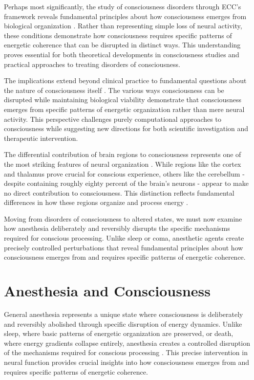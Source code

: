 \begin{refsection}
Perhaps most significantly, the study of consciousness disorders through ECC's framework reveals fundamental principles about how consciousness emerges from biological organization \cite{Tononi2015}. Rather than representing simple loss of neural activity, these conditions demonstrate how consciousness requires specific patterns of energetic coherence that can be disrupted in distinct ways. This understanding proves essential for both theoretical developments in consciousness studies and practical approaches to treating disorders of consciousness.

The implications extend beyond clinical practice to fundamental questions about the nature of consciousness itself \cite{Laureys2004}. The various ways consciousness can be disrupted while maintaining biological viability demonstrate that consciousness emerges from specific patterns of energetic organization rather than mere neural activity. This perspective challenges purely computational approaches to consciousness while suggesting new directions for both scientific investigation and therapeutic intervention.

The differential contribution of brain regions to consciousness represents one of the most striking features of neural organization \cite{Baars2005}. While regions like the cortex and thalamus prove crucial for conscious experience, others like the cerebellum - despite containing roughly eighty percent of the brain's neurons - appear to make no direct contribution to consciousness. This distinction reflects fundamental differences in how these regions organize and process energy \cite{DiPerri2014}.

Moving from disorders of consciousness to altered states, we must now examine how anesthesia deliberately and reversibly disrupts the specific mechanisms required for conscious processing. Unlike sleep or coma, anesthetic agents create precisely controlled perturbations that reveal fundamental principles about how consciousness emerges from and requires specific patterns of energetic coherence.

\section{Anesthesia and Consciousness}

General anesthesia represents a unique state where consciousness is deliberately and reversibly abolished through specific disruption of energy dynamics. Unlike sleep, where basic patterns of energetic organization are preserved, or death, where energy gradients collapse entirely, anesthesia creates a controlled disruption of the mechanisms required for conscious processing \cite{Alkire2008}. This precise intervention in neural function provides crucial insights into how consciousness emerges from and requires specific patterns of energetic coherence.


\end{refsection}
